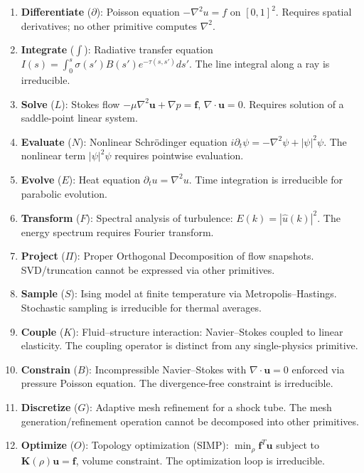 \documentclass[11pt,a4paper]{article}
\begin{document}
\begin{enumerate}[nosep]
\item \textbf{Differentiate} ($\partial$): Poisson equation $-\nabla^2 u = f$ on $[0,1]^2$. Requires spatial derivatives; no other primitive computes $\nabla^2$.

\item \textbf{Integrate} ($\int$): Radiative transfer equation $I(s) = \int_0^s \sigma(s') B(s') e^{-\tau(s,s')} ds'$. The line integral along a ray is irreducible.

\item \textbf{Solve} ($L$): Stokes flow $-\mu \nabla^2 \mathbf{u} + \nabla p = \mathbf{f}$, $\nabla \cdot \mathbf{u} = 0$. Requires solution of a saddle-point linear system.

\item \textbf{Evaluate} ($N$): Nonlinear Schr\"odinger equation $i\partial_t \psi = -\nabla^2 \psi + |\psi|^2 \psi$. The nonlinear term $|\psi|^2 \psi$ requires pointwise evaluation.

\item \textbf{Evolve} ($E$): Heat equation $\partial_t u = \nabla^2 u$. Time integration is irreducible for parabolic evolution.

\item \textbf{Transform} ($F$): Spectral analysis of turbulence: $E(k) = |\hat{u}(k)|^2$. The energy spectrum requires Fourier transform.

\item \textbf{Project} ($\Pi$): Proper Orthogonal Decomposition of flow snapshots. SVD/truncation cannot be expressed via other primitives.

\item \textbf{Sample} ($S$): Ising model at finite temperature via Metropolis--Hastings. Stochastic sampling is irreducible for thermal averages.

\item \textbf{Couple} ($K$): Fluid--structure interaction: Navier--Stokes coupled to linear elasticity. The coupling operator is distinct from any single-physics primitive.

\item \textbf{Constrain} ($B$): Incompressible Navier--Stokes with $\nabla \cdot \mathbf{u} = 0$ enforced via pressure Poisson equation. The divergence-free constraint is irreducible.

\item \textbf{Discretize} ($G$): Adaptive mesh refinement for a shock tube. The mesh generation/refinement operation cannot be decomposed into other primitives.

\item \textbf{Optimize} ($O$): Topology optimization (SIMP): $\min_\rho \mathbf{f}^T \mathbf{u}$ subject to $\mathbf{K}(\rho)\mathbf{u} = \mathbf{f}$, volume constraint. The optimization loop is irreducible.
\end{enumerate}
\end{document}
